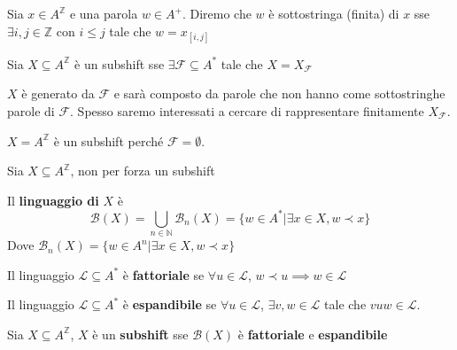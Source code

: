 \begin{definizione} 
    Sia  $x\in A^\mathbb{Z}$ e una parola $w\in A^+$. Diremo che $w$ è sottostringa (finita) 
    di $x$ sse $\exists i,j\in \mathbb{Z}$ con $i\le j$ tale che $w=x_{[i,j]}$
\end{definizione}

\begin{definizione} 
    Sia $X\subseteq A^\mathbb{Z}$ è un subshift sse $\exists \mathcal{F}\subseteq A^\ast$
    tale che $X= X_\mathcal{F}$
\end{definizione}

$X$ è generato da $\mathcal{F}$ e sarà composto da parole che non hanno come 
sottostringhe parole di $\mathcal{F}$. Spesso saremo interessati a cercare 
di rappresentare finitamente $X_\mathcal{F}$.

\begin{esempio}
    $X =  A^\mathbb{Z}$ è un subshift perché $\mathcal{F} = \emptyset$.
\end{esempio}

Sia $X\subseteq A^\mathbb{Z}$, non per forza un subshift
\begin{definizione} 
    Il \textbf{linguaggio di} $X$ è
    $$\mathcal{B}(X) = \bigcup_{n\in \mathbb{N}} \mathcal{B}_n(X)= \{w\in A^\ast| \exists x\in X, w\prec x\}$$
    Dove $\mathcal{B}_n(X) = \{w\in A^n| \exists x\in X, w\prec x\}$
\end{definizione}

\begin{definizione} 
    Il linguaggio $\mathcal{L}\subseteq A^\ast$ è \textbf{fattoriale} se $\forall
    u\in \mathcal{L}$, $w\prec u\implies w\in \mathcal{L}$

\end{definizione}


\begin{definizione} 
    Il linguaggio $\mathcal{L}\subseteq A^\ast$ è \textbf{espandibile} se $\forall
    u\in \mathcal{L}$, $\exists v,w\in \mathcal{L}$ tale che $vuw\in \mathcal{L}$.
\end{definizione}

\begin{teorema}
    Sia $X\subseteq A^\mathbb{Z}$, $X$ è un \textbf{subshift} sse $\mathcal{B}(X)$ è 
    \textbf{fattoriale} e \textbf{espandibile}
\end{teorema}

